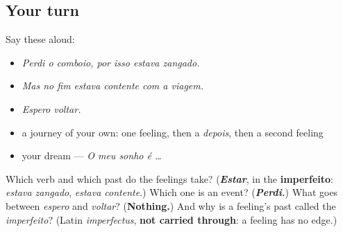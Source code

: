 \subsection*{Your turn}
Say these aloud:

\begin{itemize}
\raggedright
  \item \emph{Perdi o comboio, por isso estava zangado.}
  \item \emph{Mas no fim estava contente com a viagem.}
  \item \emph{Espero voltar.}
  \item a journey of your own: one feeling, then a \emph{depois}, then a second feeling
  \item your dream — \emph{O meu sonho é …}
\end{itemize}

\begin{tcolorbox}[breakable,colback=teal!4,colframe=teal!35!black,title={Before you move on}]
Which verb and which past do the feelings take? (\emph{\textbf{Estar}}, in the \textbf{imperfeito}: \emph{estava zangado}, \emph{estava contente}.) Which one is an event? (\emph{\textbf{Perdi.}}) What goes between \emph{espero} and \emph{voltar}? (\textbf{Nothing.}) And why is a feeling's past called the \emph{imperfeito}? (Latin \emph{imperfectus}, \textbf{not carried through}: a feeling has no edge.)
\end{tcolorbox}
